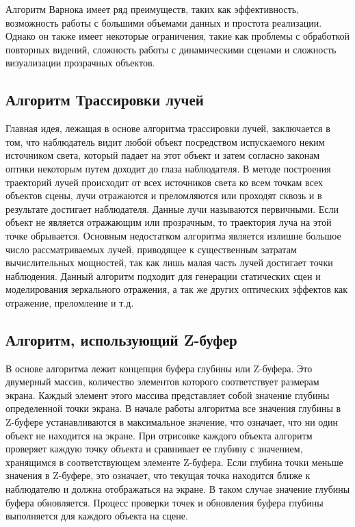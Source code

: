 Алгоритм Варнока имеет ряд преимуществ, таких как эффективность, 
возможность работы с большими объемами данных и простота реализации. 
Однако он также имеет некоторые ограничения, такие как проблемы с 
обработкой повторных видений, сложность работы с динамическими 
сценами и сложность визуализации прозрачных объектов.

\subsection{Алгоритм Трассировки лучей}
Главная идея, лежащая в основе алгоритма трассировки лучей, заключается в том, что наблюдатель видит любой объект посредством испускаемого неким источником света, который падает на этот объект и затем согласно законам оптики некоторым путем доходит до глаза наблюдателя\cite{rtx}. 
В методе построения траекторий лучей происходит от всех источников света ко всем точкам всех объектов сцены, лучи отражаются и преломляются или проходят сквозь и в результате достигает наблюдателя.
Данные лучи называются первичными.
Если объект не является отражающим или прозрачным, то траектория луча на этой точке обрывается.
Основным недостатком алгоритма является излишне большое число рассматриваемых лучей, приводящее к существенным затратам вычислительных мощностей, так как лишь малая часть лучей достигает точки наблюдения.
Данный алгоритм подходит для генерации статических сцен и моделирования зеркального отражения, а так же других оптических эффектов как отражение, преломление и т.д.

\subsection{Алгоритм, использующий Z-буфер}
В основе алгоритма лежит концепция буфера глубины или Z-буфера. 
Это двумерный массив, количество элементов которого соответствует размерам экрана. Каждый элемент этого массива представляет собой 
значение глубины определенной точки экрана. В начале работы алгоритма все значения глубины в Z-буфере устанавливаются в максимальное 
значение, что означает, что ни один объект не находится на экране. При отрисовке каждого объекта алгоритм проверяет каждую точку объекта и 
сравнивает ее глубину с значением, хранящимся в соответствующем элементе Z-буфера. Если глубина точки меньше значения в Z-буфере, это означает, что текущая точка находится ближе к наблюдателю и должна отображаться на экране. В таком случае значение глубины буфера обновляется. Процесс проверки точек и обновления буфера глубины выполняется для каждого объекта на сцене.


